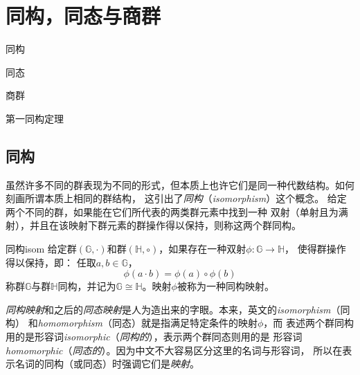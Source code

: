 %
\chapter{同构，同态与商群}
\label{chap:iso_hom} %
\begin{introduction}
  \item 同构
  \item 同态
  \item 商群
  \item 第一同构定理
\end{introduction}

\section{同构} 
\label{sec:iso}
虽然许多不同的群表现为不同的形式，但本质上也许它们是同一种代数结构。如何刻画所谓本质上相同的群结构，
这引出了\emph{同构}（\emph{isomorphism}）这个概念。
给定两个不同的群，如果能在它们所代表的两类群元素中找到一种
双射（单射且为满射），并且在该映射下群元素的群操作得以保持，则称这两个群同构。 

\begin{definition}{同构}{isom} 
	给定群$(\mathbb{G}, \cdot)$和群$(\mathbb{H}, \circ)$，如果存在一种双射$\phi\colon \mathbb{G} \to \mathbb{H}$，
	使得群操作得以保持，即：
	任取$a, b \in \mathbb{G}$，
	\[\phi(a \cdot b) = \phi(a)\circ \phi(b)\]
	称群$\mathbb{G}$与群$\mathbb{H}$同构，并记为$\mathbb{G}\cong \mathbb{H}$。映射$\phi$被称为一种同构映射。
\end{definition}

\begin{remark}
\emph{同构映射}和之后的\emph{同态映射}是人为造出来的字眼。本来，英文的\emph{isomorphism}（同构）
和\emph{homomorphism}（同态）就是指满足特定条件的映射$\phi$，而
表述两个群同构用的是形容词\emph{isomorphic}（\emph{同构的}），表示两个群同态则用的是
形容词\emph{homomorphic}（\emph{同态的}）。因为中文不大容易区分这里的名词与形容词，
所以在表示名词的同构（或同态）时强调它们是\emph{映射}。
\end{remark}

